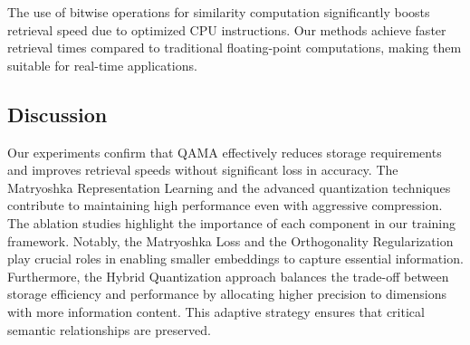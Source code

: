 \begin{table}[h]
    \centering
    \caption{Storage comparison for different embedding formats (768-dimensional vector), showing storage savings, relative performance accuracy, and computational efficiency. The ``Rel. FLOPS'' and ``Wall Clock Timing'' columns compare each method against FP32 = 1.0×, where lower numbers indicate decreased performance.}
    \label{tab:storage_comparison}
\end{table}

The use of bitwise operations for similarity computation significantly boosts retrieval speed due to optimized CPU instructions. Our methods achieve faster retrieval times compared to traditional floating-point computations, making them suitable for real-time applications.

\subsection{Discussion}
Our experiments confirm that QAMA effectively reduces storage requirements and improves retrieval speeds without significant loss in accuracy. 
The Matryoshka Representation Learning and the advanced quantization techniques contribute to maintaining high performance even with aggressive compression.
The ablation studies highlight the importance of each component in our training framework. 
Notably, the Matryoshka Loss and the Orthogonality Regularization play crucial roles in enabling smaller embeddings to capture essential information.
Furthermore, the Hybrid Quantization approach balances the trade-off between storage efficiency and performance by allocating higher precision to dimensions with more information content. 
This adaptive strategy ensures that critical semantic relationships are preserved.
